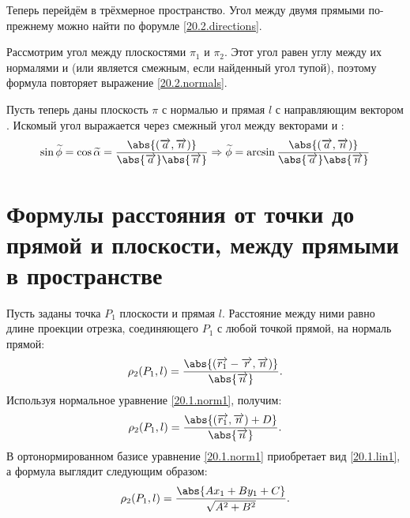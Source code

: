   Теперь перейдём в трёхмерное пространство. Угол между двумя прямыми по-прежнему можно найти по форумле \ref{20.2.directions}. 
  
  Рассмотрим угол между плоскостями $\pi_1$ и $\pi_2$. Этот угол равен углу между их нормалями  и  (или является смежным, если найденный угол тупой), поэтому формула повторяет выражение \ref{20.2.normals}.
  
  Пусть теперь даны плоскость $\pi$ с нормалью  и прямая $l$ с направляющим вектором . Искомый угол выражается через смежный угол между векторами  и :
  \begin{equation}
  \sin  \widetilde \phi = \cos  \widetilde \alpha = \dfrac{\abs{(\overrightarrow{a},\overrightarrow{n})}}{\abs{\overrightarrow{a}} \abs{\overrightarrow{n}}} \Rightarrow
  \widetilde \phi = \arcsin \dfrac{\abs{(\overrightarrow{a},\overrightarrow{n})}}{\abs{\overrightarrow{a}} \abs{\overrightarrow{n}}}
  \end{equation}



\section{Формулы расстояния от точки до прямой и плоскости, между прямыми в пространстве}
  Пусть заданы точка $P_1$ плоскости и прямая $l$. Расстояние между ними равно длине проекции отрезка, соединяющего $P_1$ с любой точкой прямой, на нормаль прямой:
  \begin{equation}\label{20.3.normals1}
  \rho_2 (P_1,l) = \dfrac{ \abs{(\overrightarrow{r_1}-\overrightarrow{r},\overrightarrow{n})} }{ \abs{\overrightarrow{n}} }.
  \end{equation}   
  Используя нормальное уравнение \ref{20.1.norm1}, получим:
  \begin{equation}\label{20.3.normals2}
  \rho_2 (P_1,l) = \dfrac{\abs{(\overrightarrow{r_1},\overrightarrow{n})+D}}{\abs{\overrightarrow{n}}}.
  \end{equation}
  В ортонормированном базисе уравнение \ref{20.1.norm1} приобретает вид \ref{20.1.lin1}, а формула выглядит следующим образом:
  \begin{equation}
  \rho_2 (P_1,l) = \dfrac{\abs{Ax_1+By_1+C}}{\sqrt{A^2+B^2}}.
  \end{equation}
  
